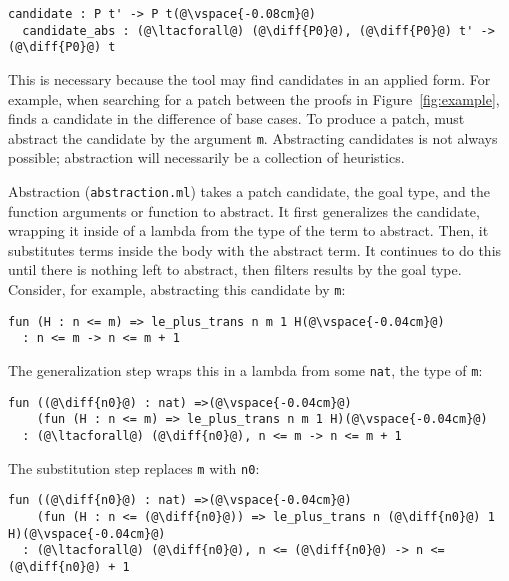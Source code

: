 \begin{lstlisting}[language=coq]
  candidate : P t' -> P t(@\vspace{-0.08cm}@)
  candidate_abs : (@\ltacforall@) (@\diff{P0}@), (@\diff{P0}@) t' -> (@\diff{P0}@) t
\end{lstlisting} 

This is necessary because the tool may find candidates in an applied form.
For example, when searching for a patch between the proofs in Figure~\ref{fig:example},
\sysname finds a candidate in the difference of base cases. To produce a patch, 
\sysname must abstract the candidate by the argument \lstinline{m}.
Abstracting candidates is not always possible; abstraction will necessarily be a collection of heuristics.

Abstraction (\lstinline{abstraction.ml}) takes a patch candidate, 
the goal type, and the function arguments or function to abstract.
It first generalizes the candidate, wrapping it inside of a lambda from the type of the term to abstract.
Then, it substitutes terms inside the body with the abstract term.
It continues to do this until there is nothing left to abstract, then filters results by the goal type.
Consider, for example, abstracting this candidate by \lstinline{m}:

\begin{lstlisting}[language=coq]
  fun (H : n <= m) => le_plus_trans n m 1 H(@\vspace{-0.04cm}@)
  : n <= m -> n <= m + 1
\end{lstlisting}
The generalization step wraps this in a lambda from some \lstinline{nat}, the type of \lstinline{m}:

\begin{lstlisting}[language=coq]
  fun ((@\diff{n0}@) : nat) =>(@\vspace{-0.04cm}@)
    (fun (H : n <= m) => le_plus_trans n m 1 H)(@\vspace{-0.04cm}@)
  : (@\ltacforall@) (@\diff{n0}@), n <= m -> n <= m + 1
\end{lstlisting}
The substitution step replaces \lstinline{m} with \lstinline{n0}:

\begin{lstlisting}[language=coq]
  fun ((@\diff{n0}@) : nat) =>(@\vspace{-0.04cm}@)
    (fun (H : n <= (@\diff{n0}@)) => le_plus_trans n (@\diff{n0}@) 1 H)(@\vspace{-0.04cm}@)
  : (@\ltacforall@) (@\diff{n0}@), n <= (@\diff{n0}@) -> n <= (@\diff{n0}@) + 1
\end{lstlisting}

